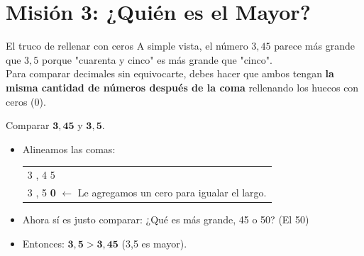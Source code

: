 \documentclass[12pt, letterpaper]{article}
\begin{document}
	\newpage
	
	\section*{Misión 3: ¿Quién es el Mayor?}
	
	\begin{concepto}{El truco de rellenar con ceros}
		A simple vista, el número $3,45$ parece más grande que $3,5$ porque "cuarenta y cinco" es más grande que "cinco".
		\\[0.2cm]
		Para comparar decimales sin equivocarte, debes hacer que ambos tengan \textbf{la misma cantidad de números después de la coma} rellenando los huecos con ceros ($0$).
	\end{concepto}
	
	\begin{ejemplo}
		Comparar $\mathbf{3,45}$ y $\mathbf{3,5}$.
		\begin{itemize}
			\item Alineamos las comas:
			\begin{tabular}{l}
				3 , 4 5 \\
				3 , 5 \textcolor{valred}{\textbf{0}} \quad $\leftarrow$ Le agregamos un cero para igualar el largo.
			\end{tabular}
			\item Ahora sí es justo comparar: ¿Qué es más grande, 45 o 50? (El 50)
			\item Entonces: $\mathbf{3,5 > 3,45}$ (3,5 es mayor).
		\end{itemize}
	\end{ejemplo}
	
\end{document}
